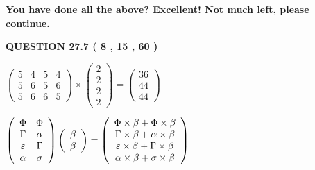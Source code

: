 \documentclass[12pt]{article}
\begin{document}
   
   
\vspace{0.3in}
{\textbf{\LARGE{You have done all the above? Excellent! Not much left, please continue.}}}
\vspace{0.3in}
   
   
  
\vspace{0.2in}
  
{\textbf{\Large{QUESTION
27.7 
 (           8 ,          15 ,          60 )
}}}
  
  
 
 
\noindent{}

 
$\left( \begin{array}{ccccccccccccccc}
           5  & 
           4  & 
           5  & 
           4  \\ 
           5  & 
           6  & 
           5  & 
           6  \\ 
           5  & 
           6  & 
           6  & 
           5
\end{array}\right) \times
\left( \begin{array}{c}
           2  \\ 
           2  \\ 
           2  \\ 
           2
\end{array}\right)  =
\left( \begin{array}{c}
          36  \\ 
          44  \\ 
          44
\end{array}\right)  $
 
$  %
 \left( \begin{array}
 {
 c
 c
 }
 \Phi & 
 \Phi \\ 
 \Gamma & 
 \alpha \\ 
 \varepsilon & 
 \Gamma \\ 
 \alpha & 
 \sigma
 \end{array} \right)
 \left( \begin{array}
 {
 c
 }
 \beta \\ 
 \beta
 \end{array} \right)
=
 \left( \begin{array}
 {
 c
 }
  \Phi \times  \beta +  \Phi \times  \beta \\ 
  \Gamma \times  \beta +  \alpha \times  \beta \\ 
  \varepsilon \times  \beta +  \Gamma \times  \beta \\ 
  \alpha \times  \beta +  \sigma \times  \beta
 \end{array} \right)
$
 
\end{document}
